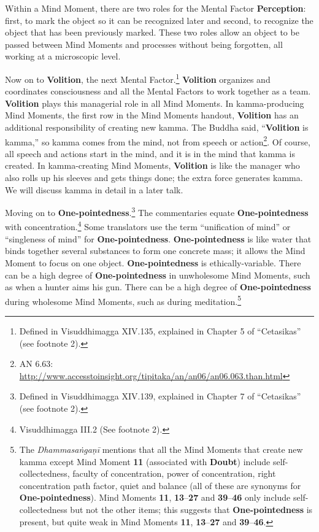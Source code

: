 Within a Mind Moment, there are two roles for the Mental Factor \textbf{Perception}: first, to mark the object so it can be recognized later and second, to recognize the object that has been previously marked. These two roles allow an object to be passed between Mind Moments and processes without being forgotten, all working at a microscopic level.

Now on to \textbf{Volition}, the next Mental Factor.\footnote{Defined in Visuddhimagga XIV.135, explained in Chapter 5 of “Cetasikas” (see footnote 2).} \textbf{Volition} organizes and coordinates consciousness and all the Mental Factors to work together as a team. \textbf{Volition} plays this managerial role in all Mind Moments. In kamma-producing Mind Moments, the first row in the Mind Moments handout, \textbf{Volition} has an additional responsibility of creating new kamma. The Buddha said, “\textbf{Volition} is kamma,” so kamma comes from the mind, not from speech or action\footnote{AN 6.63: \url{http://www.accesstoinsight.org/tipitaka/an/an06/an06.063.than.html}}. Of course, all speech and actions start in the mind, and it is in the mind that kamma is created. In kamma-creating Mind Moments, \textbf{Volition} is like the manager who also rolls up his sleeves and gets things done; the extra force generates kamma. We will discuss kamma in detail in a later talk.

Moving on to \textbf{One-pointedness}.\footnote{Defined in Visuddhimagga XIV.139, explained in Chapter 7 of “Cetasikas” (see footnote 2).} The commentaries equate \textbf{One-pointedness} with concentration.\footnote{Visuddhimagga III.2 (See footnote 2).} Some translators use the term “unification of mind” or “singleness of mind” for \textbf{One-pointedness}. \textbf{One-pointedness} is like water that binds together several substances to form one concrete mass; it allows the Mind Moment to focus on one object. \textbf{One-pointedness} is ethically-variable. There can be a high degree of \textbf{One-pointedness} in unwholesome Mind Moments, such as when a hunter aims his gun. There can be a high degree of \textbf{One-pointedness} during wholesome Mind Moments, such as during meditation.\footnote{The \textit{Dhammasaṅgaṇī} mentions that all the Mind Moments that create new kamma except Mind Moment \textbf{11} (associated with \textbf{Doubt}) include self-collectedness, faculty of concentration, power of concentration, right concentration path factor, quiet and balance (all of these are synonyms for \textbf{One-pointedness}). Mind Moments \textbf{11}, \textbf{13}--\textbf{27} and \textbf{39}--\textbf{46} only include self-collectedness but not the other items; this suggests that \textbf{One-pointedness} is present, but quite weak in Mind Moments \textbf{11}, \textbf{13}--\textbf{27} and \textbf{39}--\textbf{46}.}

